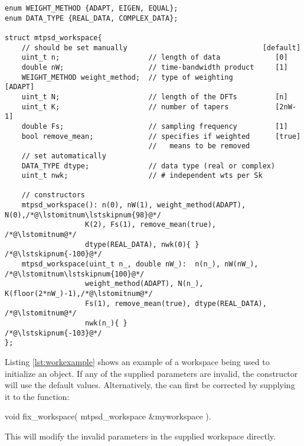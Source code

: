 \begin{lstlisting}[label=lst:mtpsdwork,caption=The \texttt{mtpsd\_workspace} structure]
enum WEIGHT_METHOD {ADAPT, EIGEN, EQUAL};
enum DATA_TYPE {REAL_DATA, COMPLEX_DATA};

struct mtpsd_workspace{
    // should be set manually                                [default]       
    uint_t n;                     // length of data             [0] 
    double nW;                    // time-bandwidth product     [1]
    WEIGHT_METHOD weight_method;  // type of weighting          [ADAPT]
    uint_t N;                     // length of the DFTs         [n]
    uint_t K;                     // number of tapers           [2nW-1]
    double Fs;                    // sampling frequency         [1]
    bool remove_mean;             // specifies if weighted      [true]
                                  //   means to be removed
    // set automatically
    DATA_TYPE dtype;              // data type (real or complex)
    uint_t nwk;                   // # independent wts per Sk

    // constructors
    mtpsd_workspace(): n(0), nW(1), weight_method(ADAPT), N(0),/*@\lstomitnum\lstskipnum{98}@*/
                   K(2), Fs(1), remove_mean(true),             /*@\lstomitnum@*/
                   dtype(REAL_DATA), nwk(0){ }                 /*@\lstskipnum{-100}@*/
    mtpsd_workspace(uint_t n_, double nW_):  n(n_), nW(nW_),   /*@\lstomitnum\lstskipnum{100}@*/
                   weight_method(ADAPT), N(n_), K(floor(2*nW_)-1),/*@\lstomitnum@*/
                   Fs(1), remove_mean(true), dtype(REAL_DATA),   /*@\lstomitnum@*/
                   nwk(n_){ }                                   /*@\lstskipnum{-103}@*/
};
\end{lstlisting}
\bigskip

Listing \ref{lst:workexample} shows an example of a workspace being used to initialize an  object.  If any of the supplied parameters are invalid, the  constructor will use the default values.  Alternatively, the  can first be corrected by supplying it to the function:
\begin{lstplainblock}
void fix_workspace( mtpsd_workspace &myworkspace ).
\end{lstplainblock}
This will modify the invalid parameters in the supplied workspace directly.

\pagebreak

